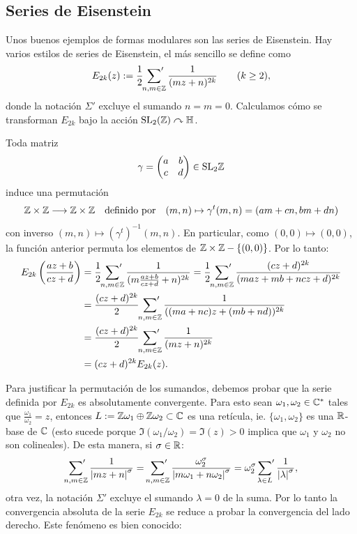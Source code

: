 \documentclass[../../tesis_maestria]{subfiles}
\begin{document}
\subsection{Series de Eisenstein}\label{sec:eisenstein}%

Unos buenos ejemplos de formas modulares son las series de Eisenstein. Hay varios
estilos de series de Eisenstein, el m\'as sencillo se define como
\[
  E_{2k}(z):=\frac{1}{2}\sideset{}{'}\sum_{n,m\in\mathbb{Z}}\frac{1}{(mz+n)^{2k}} \qquad (k\geq 2),
\]
donde la notaci\'on $\Sigma'$ excluye el sumando $n=m=0$. Calculamos c\'omo se
transforman $E_{2k}$ bajo la acci\'on $\mathrm{SL}_2(\mathbb{Z})\curvearrowright\mathbb{H}$.

Toda matriz
\[
  \gamma=
  \begin{pmatrix}
    a & b\\ c&d
  \end{pmatrix} \in \mathrm{SL}_2\mathbb{Z}
\]
induce una permutaci\'on
\[
  \mathbb{Z}\times\mathbb{Z} \longrightarrow \mathbb{Z}\times\mathbb{Z} \quad\text{definido por}\quad
  (m,n)\mapsto \gamma^t(m,n)=(am+cn,bm+dn)
\]
con inverso $(m,n)\mapsto (\gamma^t)^{-1}(m,n)$. En particular, como
$(0,0)\mapsto(0,0)$, la funci\'on anterior permuta los elementos de $\mathbb{Z}\times\mathbb{Z}-\{(0,0)\}$.
Por lo tanto:
\begin{align}
  E_{2k}\left( \frac{az+b}{cz+d} \right)&=
  \frac{1}{2}\sideset{}{'}\sum_{n,m\in\mathbb{Z}}\frac{1}{(m\frac{az+b}{cz+d}+n)^{2k}}=
  \frac{1}{2}\sideset{}{'}\sum_{n,m\in\mathbb{Z}}\frac{(cz+d)^{2k}}{(maz+mb+ncz+d)^{2k}}\nonumber\\ & =
  \frac{(cz+d)^{2k}}{2}\sideset{}{'}\sum_{n,m\in\mathbb{Z}}\frac{1}{((ma+nc)z+(mb+nd))^{2k}}\nonumber\\ &=
  \frac{(cz+d)^{2k}}{2}\sideset{}{'}\sum_{n,m\in\mathbb{Z}}\frac{1}{(mz+n)^{2k}}\nonumber\\ & =
  (cz+d)^{2k}E_{2k}(z) \label{eq:eisenstein2k}.              
\end{align}

Para justificar la permutaci\'on de los sumandos, debemos probar que la serie definida por
$E_{2k}$ es absolutamente convergente. Para esto sean $\omega_1,\omega_2\in\mathbb{C}^*$ tales que
$\tfrac{\omega_1}{\omega_2}=z$, entonces $L:=\mathbb{Z}\omega_1\oplus\mathbb{Z}\omega_2\subset\mathbb{C}$ es una
ret\'icula, ie. $\{\omega_1,\omega_2\}$ es una $\mathbb{R}$-base de $\mathbb{C}$ (esto sucede porque
$\Im(\omega_1/\omega_2)=\Im(z)>0$ implica que $\omega_1$ y $\omega_2$ no son colineales).
De esta manera, si $\sigma\in\mathbb{R}$:
\[
  \sideset{}{'}\sum_{n,m\in\mathbb{Z}}\frac{1}{\left| mz+n \right|^{\sigma}}=
  \sideset{}{'}\sum_{n,m\in\mathbb{Z}}\frac{\omega_2^{\sigma}}{\left| m\omega_1+n\omega_2 \right|^{\sigma}}=
  \omega_2^{\sigma}\sideset{}{'}\sum_{\lambda\in L}\frac{1}{\left| \lambda \right|^{\sigma}},
\]
otra vez, la notaci\'on $\Sigma'$ excluye el sumando $\lambda=0$ de la suma. Por lo tanto la
convergencia absoluta de la serie $E_{2k}$ se reduce a probar la convergencia del lado derecho.
Este fen\'omeno es bien conocido:
\end{document}
